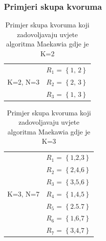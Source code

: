 \documentclass[11pt]{beamer}
\begin{document}
\begin{frame}
	\frametitle{Primjeri skupa kvoruma}
	
	\begin{table}[H]
		\centering
		\caption{Primjer skupa kvoruma koji zadovoljavaju uvjete algoritma Maekawia gdje je K=2}
		\label{my-label}
		\begin{tabular}{|l|l|}
			\hline
			& $R_1$ = $\left\{\text{1, 2}\right\}$  \\
			K=2, N=3    & $R_2$ = $\left\{\text{2, 3}\right\}$ \\ 
			& $R_3$ = $\left\{\text{1, 3}\right\}$ \\ \hline
		\end{tabular}
	\end{table}
	
	\begin{table}[H]
		\centering
		\caption{Primjer skupa kvoruma koji zadovoljavaju uvjete algoritma Maekawia gdje je K=3}
		\label{my-label}
		\begin{tabular}{|l|l|}
			\hline
			& $R_1$ = $\left\{\text{1,2,3}\right\}$  \\
			& $R_2$ = $\left\{\text{2,4,6}\right\}$  \\
			& $R_3$ = $\left\{\text{3,5,6}\right\}$  \\
			K=3, N=7    & $R_4$ = $\left\{\text{1,4,5}\right\}$ \\ 
			& $R_5$ = $\left\{\text{2.5.7}\right\}$  \\
			& $R_6$ = $\left\{\text{1,6,7}\right\}$ \\
			& $R_7$ = $\left\{\text{3,4,7}\right\}$  \\\hline
		\end{tabular}
	\end{table}
	
	
\end{frame}
\end{document}
